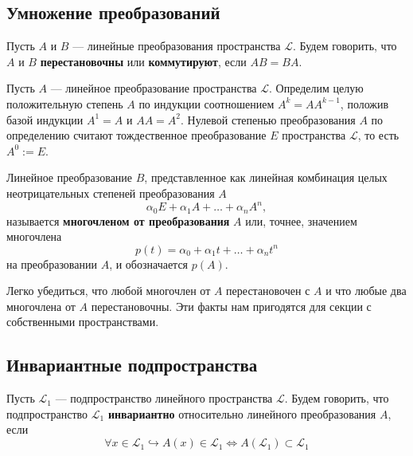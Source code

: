 \documentclass[11pt]{article}
\begin{document}
\subsection{Умножение преобразований}

\begin{definition}
    Пусть $A$ и $B$ --- линейные преобразования пространства $\mathcal{L}$. Будем говорить, что $A$ и $B$ \textbf{перестановочны} или \textbf{коммутируют}, если $AB = BA$.
\end{definition}

\begin{definition}
    Пусть $A$ --- линейное преобразование пространства $\mathcal{L}$. Определим целую положительную степень $A$ по индукции соотношением $A^{k} = A A^{k - 1}$, положив базой 
    индукции $A^{1} = A$ и $AA = A^{2}$. Нулевой степенью преобразования $A$ по определению считают тождественное преобразование $E$ пространства $\mathcal{L}$, то есть $A^{0} := E$.
\end{definition}

\begin{definition}
    Линейное преобразование $B$, представленное как линейная комбинация целых неотрицательных степеней преобразования $A$
    \[\alpha_0 E + \alpha_1 A + \ldots + \alpha_n A^n,\]
    называется \textbf{многочленом от преобразования} $A$ или, точнее, значением многочлена 
    \[p(t) = \alpha_0 + \alpha_1 t + \ldots + \alpha_n t^n\]
    на преобразовании $A$, и обозначается $p(A)$.
\end{definition}

\begin{remark}
    Легко убедиться, что любой многочлен от $A$ перестановочен с $A$ и что любые два многочлена от $A$ перестановочны. Эти факты нам пригодятся для секции с собственными пространствами.
\end{remark}

\subsection{Инвариантные подпространства}

\begin{definition}
    Пусть $\mathcal{L}_1$ --- подпространство линейного пространства $\mathcal{L}$. Будем говорить, что подпространство $\mathcal{L}_1$ \textbf{инвариантно} относительно линейного преобразования $A$, если 
    \[\forall x \in \mathcal{L}_1 \hookrightarrow A(x) \in \mathcal{L}_1 \iff A(\mathcal{L}_1) \subset \mathcal{L}_1\]
\end{definition}
\end{document}
